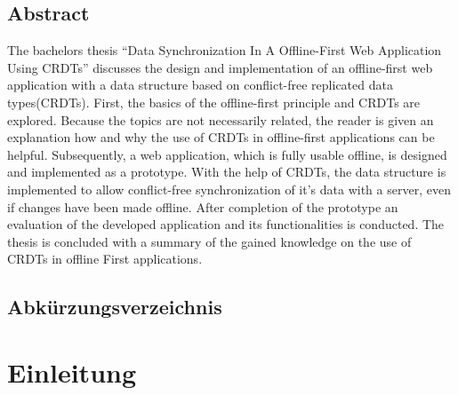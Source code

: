 \documentclass[a4paper, 12pt]{scrreprt}
\begin{document}
\section*{Abstract}
The bachelors thesis \enquote{Data Synchronization In A Offline-First Web Application Using CRDTs} discusses the design and implementation of an offline-first web application with a data structure based on conflict-free replicated data types(CRDTs). First, the basics of the offline-first principle and CRDTs are explored. Because the topics are not necessarily related, the reader is given an explanation how and why the use of CRDTs in offline-first applications can be helpful. Subsequently, a web application, which is fully usable offline, is designed and implemented as a prototype. With the help of CRDTs, the data structure is implemented to allow conflict-free synchronization of it's data with a server, even if changes have been made offline. After completion of the prototype an evaluation of the developed application and its functionalities is conducted. The thesis is concluded with a summary of the gained knowledge on the use of CRDTs in offline First applications.
\newpage

\pagestyle{fancy}
\cfoot{\thepage}
\lhead[\leftmark]{}
\rhead[]{\leftmark}

\tableofcontents
\newpage
\section*{Abkürzungsverzeichnis}
	\begin{acronym}[Bash]
	\end{acronym}

\newpage
{}
\chapter{Einleitung}\label{sec:Einleitung}
\end{document}

